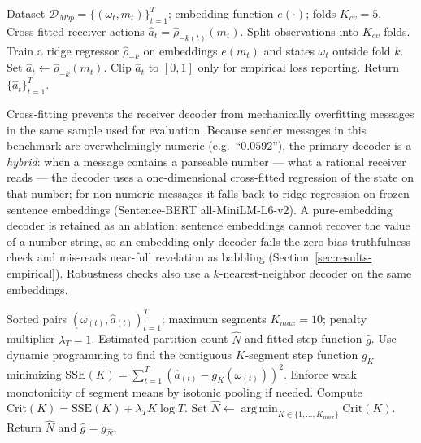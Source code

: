 \documentclass[11pt]{article}
\DeclareMathOperator*{\argmin}{arg\,min}
\newcommand{\calD}{\mathcal{D}}
\begin{document}
\begin{algorithm}[H]
\caption{Calibrate receiver action from messages}
\label{alg:receiver}
\begin{algorithmic}[1]
\Require Dataset $\calD_{Mbp}=\{(\omega_t,m_t)\}_{t=1}^{T}$; embedding function $e(\cdot)$; folds $K_{cv}=5$.
\Ensure Cross-fitted receiver actions $\widehat a_t=\widehat\rho_{-k(t)}(m_t)$.
\State Split observations into $K_{cv}$ folds.
    \State Train a ridge regressor $\widehat\rho_{-k}$ on embeddings $e(m_t)$ and states $\omega_t$ outside fold $k$.
        \State Set $\widehat a_t\gets\widehat\rho_{-k}(m_t)$.
    \EndFor
\EndFor
\State Clip $\widehat a_t$ to $[0,1]$ only for empirical loss reporting.
\State Return $\{\widehat a_t\}_{t=1}^T$.
\end{algorithmic}
\end{algorithm}

Cross-fitting prevents the receiver decoder from mechanically overfitting messages in the same sample used for evaluation.  Because sender messages in this benchmark are overwhelmingly numeric (e.g.\ ``$0.0592$''), the primary decoder is a \emph{hybrid}: when a message contains a parseable number --- what a rational receiver reads --- the decoder uses a one-dimensional cross-fitted regression of the state on that number; for non-numeric messages it falls back to ridge regression on frozen sentence embeddings (Sentence-BERT all-MiniLM-L6-v2).  A pure-embedding decoder is retained as an ablation: sentence embeddings cannot recover the value of a number string, so an embedding-only decoder fails the zero-bias truthfulness check and mis-reads near-full revelation as babbling (Section~\ref{sec:results-empirical}).  Robustness checks also use a $k$-nearest-neighbor decoder on the same embeddings.

\begin{algorithm}[H]
\caption{Estimate empirical partition count}
\label{alg:partition-estimator}
\begin{algorithmic}[1]
\Require Sorted pairs $(\omega_{(t)},\widehat a_{(t)})_{t=1}^T$; maximum segments $K_{max}=10$; penalty multiplier $\lambda_T=1$.
\Ensure Estimated partition count $\widehat N$ and fitted step function $\widehat g$.
    \State Use dynamic programming to find the contiguous $K$-segment step function $g_K$ minimizing
    \Statex \hspace{1.2cm} $\mathrm{SSE}(K)=\sum_{t=1}^{T}(\widehat a_{(t)}-g_K(\omega_{(t)}))^2$.
    \State Enforce weak monotonicity of segment means by isotonic pooling if needed.
    \State Compute $\mathrm{Crit}(K)=\mathrm{SSE}(K)+\lambda_T K\log T$.
\EndFor
\State Set $\widehat N\gets\argmin_{K\in\{1,\ldots,K_{max}\}}\mathrm{Crit}(K)$.
\State Return $\widehat N$ and $\widehat g=g_{\widehat N}$.
\end{algorithmic}
\end{algorithm}
\end{document}
